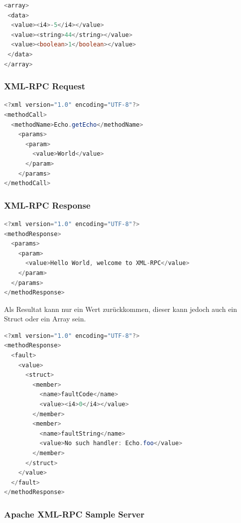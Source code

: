 \documentclass[10pt]{article}
\begin{document}
\begin{lstlisting}[language=Java, caption=Array, style=JavaStyle]
<array>
 <data>
  <value><i4>-5</i4></value>
  <value><string>44</string></value>
  <value><boolean>1</boolean></value>
 </data> 
</array>
\end{lstlisting}

\subsubsection{XML-RPC Request}
\begin{lstlisting}[language=Java, caption=Method Call, style=JavaStyle]
<?xml version="1.0" encoding="UTF-8"?>
<methodCall>
  <methodName>Echo.getEcho</methodName>
    <params>
      <param>
        <value>World</value>
      </param>
    </params>
</methodCall>
\end{lstlisting}

\subsubsection{XML-RPC Response}
\begin{lstlisting}[language=Java, caption=Single Result, style=JavaStyle]
<?xml version="1.0" encoding="UTF-8"?>
<methodResponse>
  <params>
    <param>
      <value>Hello World, welcome to XML-RPC</value>
    </param>
  </params>
</methodResponse>
\end{lstlisting}
Als Resultat kann nur ein Wert zurückkommen, dieser kann jedoch auch ein Struct oder ein Array sein.

\begin{lstlisting}[language=Java, caption=Fault Result, style=JavaStyle]
<?xml version="1.0" encoding="UTF-8"?>
<methodResponse>
  <fault>
    <value>
      <struct>
        <member>
          <name>faultCode</name>
          <value><i4>0</i4></value>
        </member>
        <member>
          <name>faultString</name>
          <value>No such handler: Echo.foo</value>
        </member>
      </struct>
    </value>
  </fault>
</methodResponse>
\end{lstlisting}

\subsubsection{Apache XML-RPC Sample Server}



\end{document}
